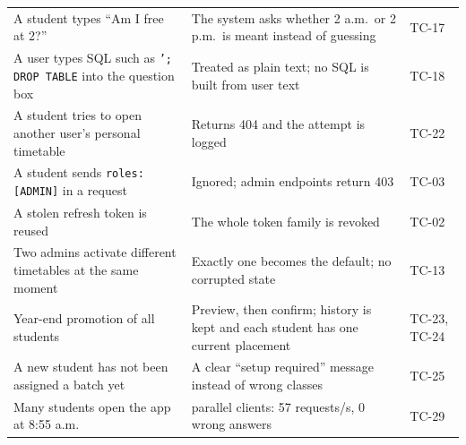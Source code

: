 \begin{longtable}{@{}>{\raggedright\arraybackslash}p{4.2cm}>{\raggedright\arraybackslash}p{7.3cm}>{\raggedright\arraybackslash}p{2.6cm}@{}}
A student types ``Am I free at 2?'' & The system asks whether 2 a.m.\ or 2 p.m.\ is meant instead of guessing & TC-17\\
A user types SQL such as \texttt{'; DROP TABLE} into the question box & Treated as plain text; no SQL is built from user text & TC-18\\
A student tries to open another user's personal timetable & Returns 404 and the attempt is logged & TC-22\\
A student sends \texttt{roles:[ADMIN]} in a request & Ignored; admin endpoints return 403 & TC-03\\
A stolen refresh token is reused & The whole token family is revoked & TC-02\\
Two admins activate different timetables at the same moment & Exactly one becomes the default; no corrupted state & TC-13\\
Year-end promotion of all students & Preview, then confirm; history is kept and each student has one current placement & TC-23, TC-24\\
A new student has not been assigned a batch yet & A clear ``setup required'' message instead of wrong classes & TC-25\\
Many students open the app at 8:55 a.m. & 32 parallel clients: 57 requests/s, 0 wrong answers & TC-29\\
\bottomrule
\end{longtable}
\endgroup

